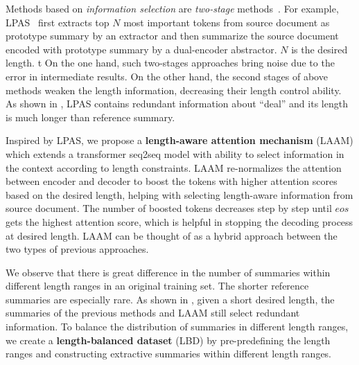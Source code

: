 Methods based on {\em information selection} 
are {\em two-stage} methods~\cite{Compress20,SeeLM17,Proto20}. 
For example, LPAS~\cite{Proto20} first extracts top $N$ most important tokens from source document as prototype summary by an extractor and then summarize the source document encoded with prototype summary by a dual-encoder abstractor.
$N$ is the desired length.
t%
On the one hand, such two-stages approaches bring noise due to the error in intermediate results.
On the other hand, the second stages of above methods weaken the length information, decreasing their length control ability.
As shown in , LPAS contains redundant information about ``deal'' and its length is much longer than reference summary.


Inspired by LPAS, we propose a {\bf length-aware attention mechanism} (LAAM) 
which extends a transformer seq2seq model with ability to select information in 
the context according to length constraints. 
LAAM re-normalizes the attention between encoder and decoder to boost the tokens with higher attention scores based on the desired length, helping with selecting length-aware information from source document.
The number of boosted tokens decreases step by step until $eos$ gets 
the highest attention score, which is helpful in stopping the decoding process 
at desired length.
LAAM can be thought of as a hybrid approach between the two types of previous approaches.

We observe that there is great difference in the number of summaries within different length ranges in an original training set. 
The shorter reference summaries are especially rare.
As shown in ,
given a short desired length, the summaries of
the previous methods and LAAM still select redundant information.
To balance the distribution of summaries in different length ranges, we create a {\bf length-balanced dataset} (LBD) by pre-predefining the length ranges and constructing extractive summaries within different length ranges.

